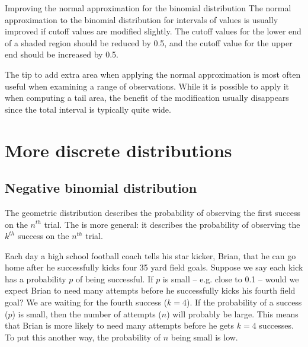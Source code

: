 \begin{onebox}{Improving the normal approximation for the binomial distribution}
  The normal approximation to the binomial distribution
  for intervals of values is usually improved if cutoff
  values are modified slightly.
  The cutoff values for the lower end of a shaded region
  should be reduced by 0.5, and the cutoff value for the
  upper end should be increased by 0.5.
\end{onebox}

The tip to add extra area when applying the normal approximation is most often useful when examining a range of observations. While it is possible to apply it when computing a tail area, the benefit of the modification usually disappears since the total interval is typically quite wide.




\section{More discrete distributions}
\label{discreteModels}

\subsection{Negative binomial distribution}
\label{negativeBinomial}


The geometric distribution describes the probability of observing the first success on the $n^{th}$ trial. The  is more general: it describes the probability of observing the $k^{th}$ success on the $n^{th}$ trial.

\begin{examplewrap}
\begin{nexample}{Each day a high school football coach tells his star kicker, Brian, that he can go home after he successfully kicks four 35 yard field goals. Suppose we say each kick has a probability $p$ of being successful. If $p$ is small -- e.g. close to 0.1 -- would we expect Brian to need many attempts before he successfully kicks his fourth field goal?}
We are waiting for the fourth success ($k=4$). If the probability of a success ($p$) is small, then the number of attempts ($n$) will probably be large. This means that Brian is more likely to need many attempts before he gets $k=4$ successes. To put this another way, the probability of $n$ being small is low.
\end{nexample}
\end{examplewrap}

